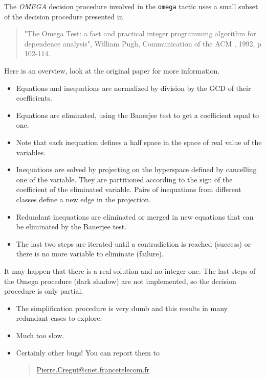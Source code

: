 
The {\it OMEGA} decision procedure involved in the {\tt omega} tactic uses
a small subset of the decision procedure presented in

\begin{quote}
  "The Omega Test: a fast and practical integer programming
algorithm for dependence analysis", William Pugh, Communication of the
ACM , 1992, p 102-114.
\end{quote}

Here is an overview, look at the original paper for more information.

\begin{itemize}

\item Equations and inequations are normalized by division by the GCD of their
     coefficients.
\item Equations are eliminated, using the Banerjee test to get a coefficient 
     equal to one.
\item Note that each inequation defines a half space in the space of real value
     of the variables.
   \item Inequations are solved by projecting on the hyperspace
     defined by cancelling one of the variable.  They are partitioned
     according to the sign of the coefficient of the eliminated
     variable. Pairs of inequations from different classes define a
     new edge in the projection.
   \item Redundant inequations are eliminated or merged in new
     equations that can be eliminated by the Banerjee test.
\item The last two steps are iterated until a contradiction is reached
     (success) or there is no more variable to eliminate (failure).

\end{itemize}

It may happen that there is a real solution and no integer one. The last
steps of the Omega procedure (dark shadow) are not implemented, so the 
decision procedure is only partial.


\begin{itemize}
\item The simplification procedure is very dumb and this results in
  many redundant cases to explore.

\item Much too slow.

\item Certainly other bugs! You can report them to

\begin{quote}
  \url{Pierre.Cregut@cnet.francetelecom.fr}
\end{quote}

\end{itemize}

